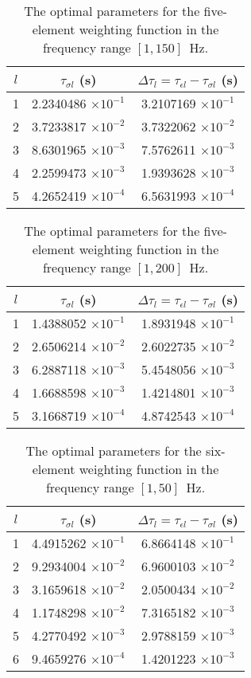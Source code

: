 \documentclass[article]{./macros/elsarticle_qh}
\begin{document}
\begin{table}[H]
\centering
\caption{The optimal parameters for the five-element weighting function in the frequency range $[1,150]$~Hz.}
\label{tab:tabl3}
\begin{tabular}{c c c}
\toprule
$l$ & $\tau_{\sigma l}$ (s) & $\Delta \tau_{l} = \tau_{\epsilon l}-\tau_{\sigma l}$ (s) \\
\midrule
1 &	2.2340486 $\times 10^{-1}$ &	3.2107169 $\times 10^{-1}$ \\
2 &	3.7233817 $\times 10^{-2}$ &	3.7322062 $\times 10^{-2}$ \\
3 &	8.6301965 $\times 10^{-3}$ &	7.5762611 $\times 10^{-3}$ \\
4 &	2.2599473 $\times 10^{-3}$ &	1.9393628 $\times 10^{-3}$ \\
5 &	4.2652419 $\times 10^{-4}$ &	6.5631993 $\times 10^{-4}$ \\
\bottomrule     
\end{tabular}
\end{table}

\begin{table}[H]
\centering
\caption{The optimal parameters for the five-element weighting function in the frequency range $[1,200]$~Hz.}
\label{tab:tabl4}
\begin{tabular}{c c c}
\toprule
$l$ & $\tau_{\sigma l}$ (s) & $\Delta \tau_{l} = \tau_{\epsilon l}-\tau_{\sigma l}$ (s) \\
\midrule
1 &	1.4388052 $\times 10^{-1}$ &	1.8931948 $\times 10^{-1}$ \\
2 &	2.6506214 $\times 10^{-2}$ &	2.6022735 $\times 10^{-2}$ \\
3 &	6.2887118 $\times 10^{-3}$ &	5.4548056 $\times 10^{-3}$ \\
4 &	1.6688598 $\times 10^{-3}$ &	1.4214801 $\times 10^{-3}$ \\
5 &	3.1668719 $\times 10^{-4}$ &	4.8742543 $\times 10^{-4}$ \\
\bottomrule     
\end{tabular}
\end{table}

\begin{table}[H]
\centering
\caption{The optimal parameters for the six-element weighting function in the frequency range $[1,50]$~Hz.}
\label{tab:tabl5}
\begin{tabular}{c c c}
\toprule
$l$ & $\tau_{\sigma l}$ (s) & $\Delta \tau_{l} = \tau_{\epsilon l}-\tau_{\sigma l}$ (s)\\
\midrule
1 &	4.4915262 $\times 10^{-1}$ &	6.8664148 $\times 10^{-1}$ \\
2 &	9.2934004 $\times 10^{-2}$ &	6.9600103 $\times 10^{-2}$ \\
3 &	3.1659618 $\times 10^{-2}$ &	2.0500434 $\times 10^{-2}$ \\
4 &	1.1748298 $\times 10^{-2}$ &	7.3165182 $\times 10^{-3}$ \\
5 &	4.2770492 $\times 10^{-3}$ &	2.9788159 $\times 10^{-3}$ \\
6 &	9.4659276 $\times 10^{-4}$ &	1.4201223 $\times 10^{-3}$ \\
\bottomrule   
\end{tabular}
\end{table}
\end{document}
